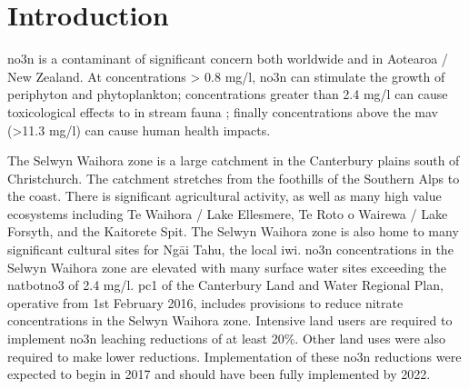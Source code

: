 
\section[Introduction]{Introduction} \label{sec:intro}

\gls{no3n} is a contaminant of significant concern both worldwide and in Aotearoa / New Zealand.
At concentrations > 0.8 mg/l, \gls{no3n} can stimulate the growth of periphyton and phytoplankton\citep{mcdowell_global_2020}; concentrations greater than 2.4 mg/l can cause toxicological effects to in stream fauna
\citep{camargo_nitrate_2005, horak_assessing_2019,wagenhoff_identifying_2017};
finally concentrations above the \gls{mav} (>11.3 mg/l) can cause human health impacts\citep{rahman_anthropogenic_2021}.

The Selwyn Waihora zone is a large catchment in the Canterbury plains south of Christchurch.
The catchment stretches from the foothills of the Southern Alps to the coast.
There is significant agricultural activity, as well as many high value ecosystems including Te Waihora / Lake Ellesmere, Te Roto o Wairewa / Lake Forsyth, and the Kaitorete Spit.
The Selwyn Waihora zone is also home to many significant cultural sites for Ngāi Tahu, the local iwi.
\gls{no3n} concentrations in the Selwyn Waihora zone are elevated with many surface water sites exceeding the \gls{natbotno3} of 2.4 mg/l\citep{noauthor_national_2020}.
\gls{pc1} of the Canterbury Land and Water Regional Plan, operative from 1st February 2016, includes provisions to reduce nitrate concentrations in the Selwyn Waihora zone.
Intensive land users are required to implement \gls{no3n} leaching reductions of at least 20\%.
Other land uses were also required to make lower reductions.
Implementation of these \gls{no3n} reductions were expected to begin in 2017 and should have been fully implemented by 2022.

